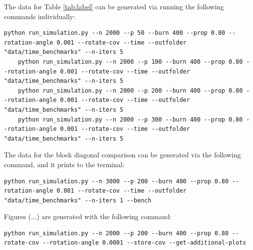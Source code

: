 The data for Table \ref{tab:label} can be generated via running the following commands individually:
\begin{lstlisting}[style=terminal]
    python run_simulation.py --n 2000 --p 50 --burn 400 --prop 0.80 --rotation-angle 0.001 --rotate-cov --time --outfolder "data/time_benchmarks" --n-iters 5
    python run_simulation.py --n 2000 --p 100 --burn 400 --prop 0.80 --rotation-angle 0.001 --rotate-cov --time --outfolder "data/time_benchmarks" --n-iters 5
    python run_simulation.py --n 2000 --p 200 --burn 400 --prop 0.80 --rotation-angle 0.001 --rotate-cov --time --outfolder "data/time_benchmarks" --n-iters 5
    python run_simulation.py --n 2000 --p 300 --burn 400 --prop 0.80 --rotation-angle 0.001 --rotate-cov --time --outfolder "data/time_benchmarks" --n-iters 5
\end{lstlisting}

The data for the block diagonal comparison can be generated via the following command, and it prints to the terminal:
\begin{lstlisting}[style=terminal]
    python run_simulation.py --n 3000 --p 200 --burn 400 --prop 0.80 --rotation-angle 0.001 --rotate-cov --time --outfolder "data/time_benchmarks" --n-iters 1 --bench
\end{lstlisting}

Figures (...) are generated with the following command:
\begin{lstlisting}[style=terminal]
    python run_simulation.py --n 2000 --p 200 --burn 400 --prop 0.80 --rotate-cov --rotation-angle 0.0001 --store-cov --get-additional-plots
\end{lstlisting}